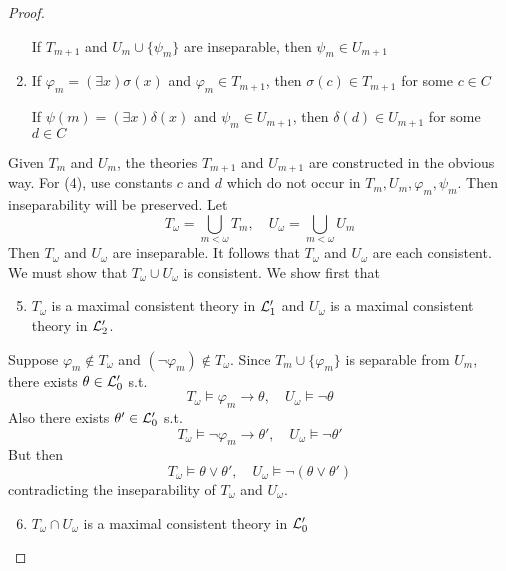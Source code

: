 \documentclass[11pt]{article}
\begin{document}
\begin{proof}
\begin{enumerate}
If \(T_{m+1}\) and \(U_m\cup\{\psi_m\}\) are inseparable, then \(\psi_m\in
      U_{m+1}\)
\item If \(\varphi_m=(\exists x)\sigma(x)\) and \(\varphi_m\in T_{m+1}\), then
\(\sigma(c)\in T_{m+1}\) for some \(c\in C\)

If \(\psi(m)=(\exists x)\delta(x)\) and \(\psi_m\in U_{m+1}\), then \(\delta(d)\in
      U_{m+1}\) for some \(d\in C\)
\end{enumerate}


Given \(T_m\) and \(U_m\), the theories \(T_{m+1}\) and \(U_{m+1}\) are
constructed in the obvious way. For (4), use constants \(c\) and \(d\) which
do not occur in \(T_m,U_m,\varphi_m,\psi_m\). Then inseparability will be
preserved. Let
\begin{equation*}
T_\omega=\bigcup_{m<\omega}T_m,\quad
U_\omega=\bigcup_{m<\omega}U_m
\end{equation*}
Then \(T_\omega\) and \(U_\omega\) are inseparable. It follows that
\(T_\omega\) and \(U_\omega\) are each consistent. We must show that
\(T_\omega\cup U_\omega\) is consistent. We show first that
\begin{enumerate}
\setcounter{enumi}{4}
\item \(T_\omega\) is a maximal consistent theory in \(\mathcal{L}_1'\) and
\(U_\omega\) is a maximal consistent theory  in \(\mathcal{L}_2'\).
\end{enumerate}


Suppose \(\varphi_m\not\in T_\omega\) and \((\neg\varphi_m)\not\in
   T_\omega\). Since
\(T_m\cup\{\varphi_m\}\) is separable from \(U_m\), there exists
\(\theta\in\mathcal{L}_0'\) s.t.
\begin{equation*}
T_\omega\models\varphi_m\to\theta,\quad
U_\omega\models\neg\theta
\end{equation*}
Also there exists \(\theta'\in\mathcal{L}_0'\) s.t.
\begin{equation*}
T_\omega\models\neg\varphi_m\to\theta',\quad
U_\omega\models\neg\theta'
\end{equation*}
But then
\begin{equation*}
T_\omega\models\theta\vee\theta',\quad
U_\omega\models\neg(\theta\vee\theta')
\end{equation*}
contradicting the inseparability of \(T_\omega\) and \(U_\omega\).
\begin{enumerate}
\setcounter{enumi}{5}
\item \(T_\omega\cap U_\omega\) is a maximal consistent theory in
\(\mathcal{L}_0'\)
\end{enumerate}



\end{proof}
\end{document}
